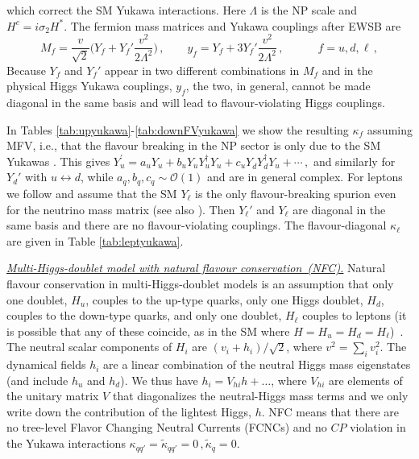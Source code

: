 \documentclass[../report.tex]{subfiles}
\begin{document}
which correct the SM Yukawa interactions. 
        Here $\Lambda$ is the NP scale and $H^c =
i\sigma_2H^\ast$. The fermion mass matrices and
Yukawa couplings after EWSB are 
\begin{equation}
M_f=\frac{v}{\sqrt2}\Big(Y_f +Y_f' \frac{v^2}{2 \Lambda^2}\Big)\,,
\qquad y_f=Y_f +3 Y_f' \frac{v^2}{2 \Lambda^2}\,, \qquad \quad f=u,d, \ell\,, 
\end{equation}
Because $Y_f$ and $Y_{f}'$ appear in two different combinations in
$M_f$ and in the physical Higgs Yukawa couplings, $y_f$, the two, in general, cannot be made diagonal in the
same basis and will lead to flavour-violating Higgs couplings.

In Tables \ref{tab:upyukawa}-\ref{tab:downFVyukawa} we show the resulting $\kappa_f$ assuming MFV, i.e.,  that the flavour breaking in the NP sector is only due to the SM
Yukawas \cite{D'Ambrosio:2002ex, Chivukula:1987py,
  Gabrielli:1994ff, Ali:1999we, Buras:2000dm, Buras:2003jf,
  Kagan:2009bn}. This gives  $Y_u^{\prime}= a_uY_u +
        b^{\phantom\dagger}_uY^{\phantom\dagger}_uY_u^\dagger
        Y^{\phantom\dagger}_u + c^{\phantom\dagger}_u
        Y^{\phantom\dagger}_dY_d^\dagger
        Y^{\phantom\dagger}_u+\cdots\,,$ and similarly for $Y_d'$ with $u\leftrightarrow d$, while
        $a_q, b_q, c_q\sim {\mathcal O}(1)$ and are in general complex. For leptons we follow \cite{Dery:2013rta} and assume that the SM $Y_{\ell}$ is the only flavour-breaking spurion even for the neutrino mass matrix (see also \cite{Cirigliano:2005ck}). Then $Y_\ell'$ and $Y_{\ell}$ are diagonal in the same basis and there are no flavour-violating couplings. The flavour-diagonal $\kappa_\ell$ are given in Table \ref{tab:leptyukawa}.
        

\underline{\it Multi-Higgs-doublet model with natural flavour conservation~(NFC).}
Natural flavour conservation in multi-Higgs-doublet models is an assumption that only one doublet, $H_u$, couples to the up-type quarks, only one Higgs doublet, $H_d$, couples to the down-type quarks, and only one doublet, $H_\ell$ couples to leptons (it is possible that any of these coincide, as in the SM where $H=H_u=H_d=H_\ell$)~\cite{Glashow:1976nt, Paschos:1976ay}. The neutral scalar components of $H_i$ are $(v_i+h_i)/\sqrt2$, where
$v^2=\sum_i v_i^2$. The dynamical fields $h_{i}$ are a linear combination of the neutral
Higgs mass eigenstates (and include $h_u$ and $h_d$). We thus have
$h_i=V_{hi} h + \ldots$, where $V_{hi}$ are elements of the unitary
matrix $V$ that diagonalizes the neutral-Higgs mass terms and we only
write down the contribution of the lightest Higgs, $h$. NFC means that there are no tree-level Flavor Changing Neutral Currents (FCNCs) and no $CP$
violation in the Yukawa interactions $\kappa_{qq'}=\tilde \kappa_{qq'}=0\,, \tilde \kappa_q=0$. 
\end{document}
